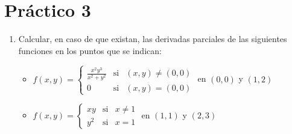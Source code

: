 \documentclass[11pt]{book}
\theoremstyle{definicion}
\theoremstyle{teorema}
\theoremstyle{ejemplo}
\begin{document}





\newpage

\section{Práctico 3}

\begin{enumerate}


\item Calcular, en caso de que existan, las derivadas parciales de las
  siguientes funciones en los puntos que se indican:
  \begin{itemize}
  \item[a)] $f(x,y)=\left\{ 
\begin{array}{ccc}
\frac{x^{2}y^{3}}{x^{2}+y^{2}} & \text{si} & \left( x,y\right) \neq \left(
0,0\right)  \\ 
0 & \text{si} & \left( x,y\right) =\left( 0,0\right) 
\end{array}%
\right. $ en $\left( 0,0\right) $ y $\left( 1,2\right) $

\item[b)] $f(x,y)=\left\{ 
\begin{array}{ccc}
xy & \text{si} & x\neq 1 \\ 
y^{2} & \text{si} & x=1%
\end{array}%
\right. $ en $\left( 1,1\right) $ y $\left( 2,3\right) 
$


\end{itemize}
\end{enumerate}
\end{document}
